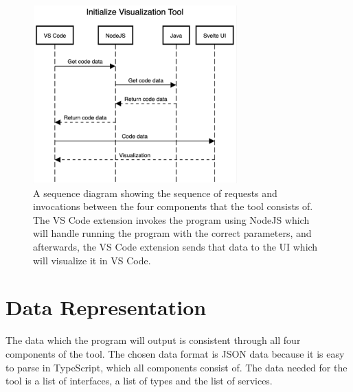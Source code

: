 \begin{figure}[h!]
    \center
    \includegraphics[width=0.70\textwidth]{figures/init_tool_sequence.png}
    \caption{A sequence diagram showing the sequence of requests and invocations between the four components that the tool consists of. The VS Code extension invokes the \nodetoolname[] program using NodeJS which will handle running the \javatoolname[] program with the correct parameters, and afterwards, the VS Code extension sends that data to the UI which will visualize it in VS Code.}
    \label{figure:init_tool_sequence}
\end{figure}

\section{Data Representation}
The data which the \javatoolname[] program will output is consistent through all
four components of the tool. The chosen data format is JSON data because it is easy to parse in TypeScript, which all components consist of.
The data needed for the tool is a list of interfaces, a list of types and the list of services.

